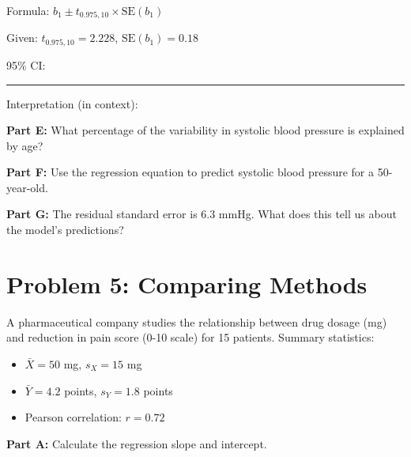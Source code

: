\documentclass[11pt]{article}
\begin{document}
Formula: $b_1 \pm t_{0.975, 10} \times \text{SE}(b_1)$

\vspace{0.3cm}

Given: $t_{0.975, 10} = 2.228$, $\text{SE}(b_1) = 0.18$

\vspace{3cm}

95\% CI: \rule{6cm}{0.4pt}

\vspace{0.5cm}

Interpretation (in context):

\vspace{2.5cm}

\textbf{Part E:} What percentage of the variability in systolic blood pressure is explained by age?

\vspace{2cm}

\textbf{Part F:} Use the regression equation to predict systolic blood pressure for a 50-year-old.

\vspace{3cm}

\textbf{Part G:} The residual standard error is 6.3 mmHg. What does this tell us about the model's predictions?

\vspace{3cm}

\newpage

\section{Problem 5: Comparing Methods}

A pharmaceutical company studies the relationship between drug dosage (mg) and reduction in pain score (0-10 scale) for 15 patients. Summary statistics:

\begin{itemize}
\item $\bar{X} = 50$ mg, $s_X = 15$ mg
\item $\bar{Y} = 4.2$ points, $s_Y = 1.8$ points
\item Pearson correlation: $r = 0.72$
\end{itemize}

\vspace{0.5cm}

\textbf{Part A:} Calculate the regression slope and intercept.

\vspace{0.3cm}
\end{document}
